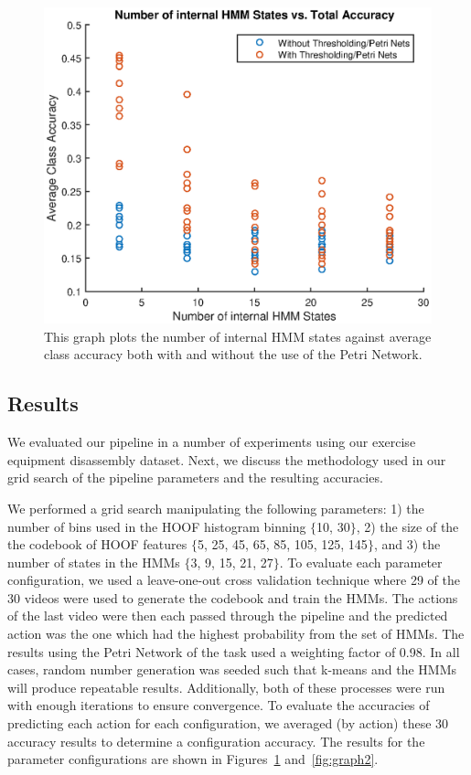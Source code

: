\documentclass[10pt,twocolumn,letterpaper]{article}
\begin{document}
\begin{figure}[!b]
    \centering
    \includegraphics[width=\columnwidth]{fig/states_plot.eps}
    \caption{This graph plots the number of internal HMM states against average class accuracy both with and without the use of the Petri Network. }
    \label{fig:graph1}
\end{figure}

\subsection{Results}

We evaluated our pipeline in a number of experiments using our exercise equipment disassembly dataset. Next, we discuss the methodology used in our grid search of the pipeline parameters and the resulting accuracies.

We performed a grid search manipulating the following parameters: 1) the number of bins used in the HOOF histogram binning $\{$10, 30$\}$, 2) the size of the the codebook of HOOF features $\{$5, 25, 45, 65, 85, 105, 125, 145$\}$, and 3) the number of states in the HMMs $\{$3, 9, 15, 21, 27$\}$. To evaluate each parameter configuration, we used a leave-one-out cross validation technique where 29 of the 30 videos were used to generate the codebook and train the HMMs. The actions of the last video were then each passed through the pipeline and the predicted action was the one which had the highest probability from the set of HMMs. The results using the Petri Network of the task used a weighting factor of 0.98. In all cases, random number generation was seeded such that k-means and the HMMs will produce repeatable results. Additionally, both of these processes were run with enough iterations to ensure convergence. To evaluate the accuracies of predicting each action for each configuration, we averaged (by action) these 30 accuracy results to determine a configuration accuracy. The results for the parameter configurations are shown in Figures~\ref{fig:graph1} and~\ref{fig:graph2}.
 
\end{document}
